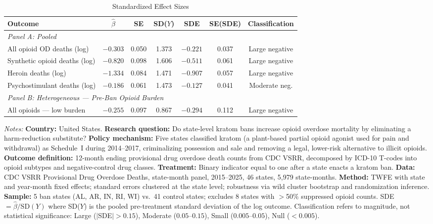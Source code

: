 \begin{table}[htbp]
\centering
\caption{Standardized Effect Sizes}
\label{tab:sde}
\footnotesize
\begin{threeparttable}
\begin{tabular}{lcccccc}
\toprule
Outcome & $\hat{\beta}$ & SE & SD($Y$) & SDE & SE(SDE) & Classification \\
\midrule
\multicolumn{7}{l}{\textit{Panel A: Pooled}} \\
All opioid OD deaths (log) & $-0.303$ & 0.050 & 1.373 & $-0.221$ & 0.037 & Large negative \\
Synthetic opioid deaths (log) & $-0.820$ & 0.098 & 1.606 & $-0.511$ & 0.061 & Large negative \\
Heroin deaths (log) & $-1.334$ & 0.084 & 1.471 & $-0.907$ & 0.057 & Large negative \\
Psychostimulant deaths (log) & $-0.186$ & 0.061 & 1.473 & $-0.127$ & 0.041 & Moderate neg. \\
\midrule
\multicolumn{7}{l}{\textit{Panel B: Heterogeneous --- Pre-Ban Opioid Burden}} \\
All opioids --- low burden & $-0.255$ & 0.097 & 0.867 & $-0.294$ & 0.112 & Large negative \\
\bottomrule
\end{tabular}
\begin{tablenotes}[flushleft]\small
\item \textit{Notes:} \textbf{Country:} United States. \textbf{Research question:} Do state-level kratom bans increase opioid overdose mortality by eliminating a harm-reduction substitute? \textbf{Policy mechanism:} Five states classified kratom (a plant-based partial opioid agonist used for pain and withdrawal) as Schedule~I during 2014--2017, criminalizing possession and sale and removing a legal, lower-risk alternative to illicit opioids. \textbf{Outcome definition:} 12-month ending provisional drug overdose death counts from CDC VSRR, decomposed by ICD-10 T-codes into opioid subtypes and negative-control drug classes. \textbf{Treatment:} Binary indicator equal to one after a state enacts a kratom ban. \textbf{Data:} CDC VSRR Provisional Drug Overdose Deaths, state-month panel, 2015--2025, 46 states, 5,979 state-months. \textbf{Method:} TWFE with state and year-month fixed effects; standard errors clustered at the state level; robustness via wild cluster bootstrap and randomization inference. \textbf{Sample:} 5 ban states (AL, AR, IN, RI, WI) vs.\ 41 control states; excludes 8 states with $>$50\% suppressed opioid counts. SDE $= \hat{\beta} / \text{SD}(Y)$ where SD($Y$) is the pooled pre-treatment standard deviation of the log outcome. Classification refers to magnitude, not statistical significance: Large ($|$SDE$| > 0.15$), Moderate ($0.05$--$0.15$), Small ($0.005$--$0.05$), Null ($< 0.005$).
\end{tablenotes}
\end{threeparttable}
\end{table}
